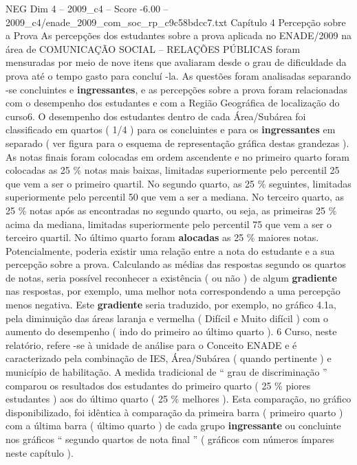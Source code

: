 \begin{textsample}{NEG Dim 4 – 2009\_c4 – Score -6.00 – 2009\_c4/enade\_2009\_com\_soc\_rp\_c9c58bdcc7.txt}  \label{ex:f4_neg_024}
Capítulo 4 Percepção sobre a Prova As percepções dos estudantes sobre a prova aplicada no ENADE/2009 na área de COMUNICAÇÃO SOCIAL – RELAÇÕES PÚBLICAS foram mensuradas por meio de nove itens que avaliaram desde o grau de dificuldade da prova até o tempo gasto para concluí -la.
As questões foram analisadas separando -se concluintes e \textbf{ingressantes}, e as percepções sobre a prova foram relacionadas com o desempenho dos estudantes e com a Região Geográfica de localização do curso6.
O desempenho dos estudantes dentro de cada Área/Subárea foi classificado em quartos ( 1/4 ) para os concluintes e para os \textbf{ingressantes} em separado ( ver figura para o esquema de representação gráfica destas grandezas ).
As notas finais foram colocadas em ordem ascendente e no primeiro quarto foram colocadas as 25 \% notas mais baixas, limitadas superiormente pelo percentil 25 que vem a ser o primeiro quartil.
No segundo quarto, as 25 \% seguintes, limitadas superiormente pelo percentil 50 que vem a ser a mediana.
No terceiro quarto, as 25 \% notas após as encontradas no segundo quarto, ou seja, as primeiras 25 \% acima da mediana, limitadas superiormente pelo percentil 75 que vem a ser o terceiro quartil.
No último quarto foram \textbf{alocadas} as 25 \% maiores notas.
Potencialmente, poderia existir uma relação entre a nota do estudante e a sua percepção sobre a prova.
Calculando as médias das respostas segundo os quartos de notas, seria possível reconhecer a existência ( ou não ) de algum \textbf{gradiente} nas respostas, por exemplo, uma melhor nota correspondendo a uma percepção menos negativa.
Este \textbf{gradiente} seria traduzido, por exemplo, no gráfico 4.1a, pela diminuição das áreas laranja e vermelha ( Difícil e Muito difícil ) com o aumento do desempenho ( indo do primeiro ao último quarto ). 6 Curso, neste relatório, refere -se à unidade de análise para o Conceito ENADE e é caracterizado pela combinação de IES, Área/Subárea ( quando pertinente ) e município de habilitação.
A medida tradicional de “ grau de discriminação ” comparou os resultados dos estudantes do primeiro quarto ( 25 \% piores estudantes ) aos do último quarto ( 25 \% melhores ).
Esta comparação, no gráfico disponibilizado, foi idêntica à comparação da primeira barra ( primeiro quarto ) com a última barra ( último quarto ) de cada grupo \textbf{ingressante} ou concluinte nos gráficos “ segundo quartos de nota final ” ( gráficos com números ímpares neste capítulo ).

\end{textsample}
